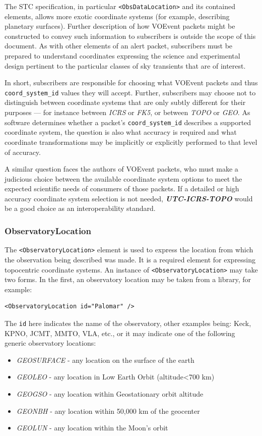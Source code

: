 \documentclass[11pt,a4paper]{ivoa}
\begin{document}
The STC specification, in particular {\tt <ObsDataLocation>} and its contained elements, allows more exotic coordinate systems (for example, describing planetary surfaces). Further description of how VOEvent packets might be constructed to convey such information to subscribers is outside the scope of this document. As with other elements of an alert packet, subscribers must be prepared to understand coordinates expressing the science and experimental design pertinent to the particular classes of sky transients that are of interest. 

In short, subscribers are responsible for choosing what VOEvent packets and thus {\tt coord\_system\_id} values they will accept. Further, subscribers may choose not to distinguish between coordinate systems that are only subtly different for their purposes --- for instance between \emph{ICRS} or \emph{FK5}, or between \emph{TOPO} or \emph{GEO}. As software determines whether a packet's {\tt coord\_system\_id} describes a supported coordinate system, the question is also what accuracy is required and what coordinate transformations may be implicitly or explicitly performed to that level of accuracy. 

A similar question faces the authors of VOEvent packets, who must make a judicious choice between the available coordinate system options to meet the expected scientific needs of consumers of those packets. If a detailed or high accuracy coordinate system selection is not needed, \emph{\bf UTC-ICRS-TOPO} would be a good choice as an interoperability standard. 

\subsubsection{ObservatoryLocation}
\label{sec:3.4.2}
The {\tt <ObservatoryLocation>} element is used to express the location from which the observation being described was made. It is a required element for expressing topocentric coordinate systems. An instance of {\tt <ObservatoryLocation>} may take two forms. In the first, an observatory location may be taken from a library, for example: 
{\footnotesize
\begin{verbatim}
<ObservatoryLocation id="Palomar" /> 
\end{verbatim}}
The {\tt id} here indicates the name of the observatory, other examples being: Keck, KPNO, JCMT, MMTO, VLA, etc., or it may indicate one of the following generic observatory locations: 
\begin{itemize}
\item \emph{GEOSURFACE} - any location on the surface of the earth
\item \emph{GEOLEO} - any location in Low Earth Orbit (altitude<700 km)
\item \emph{GEOGSO} - any location within Geostationary orbit altitude
\item \emph{GEONBH} - any location within 50,000 km of the geocenter
\item \emph{GEOLUN} - any location within the Moon's orbit
\end{itemize}
\end{document}
